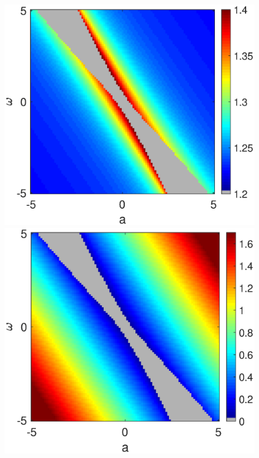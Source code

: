 \begin{figure}[h]
\begin{minipage}{0.45\linewidth}
  \end{minipage} 
  
  \begin{minipage}{0.45\linewidth}
  \begin{center}
\includegraphics[width=1\linewidth]{Images/photo14_3.eps}
\end{center}
  \end{minipage} 
  \begin{minipage}{0.45\linewidth}
  \begin{center}
\includegraphics[width=1\linewidth]{Images/photo14_4.eps}
\end{center}


\end{minipage}
\end{figure}
